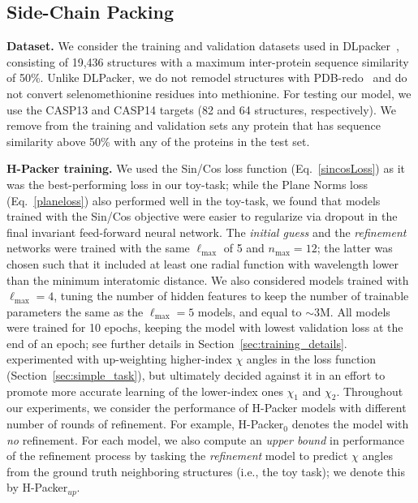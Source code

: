 \subsection{Side-Chain Packing}

\textbf{Dataset.} We consider the training and validation datasets used in 
DLpacker~\citep{misiura_dlpacker_2022}, consisting of 19,436 structures with a maximum
inter-protein sequence similarity of 50\%. Unlike DLPacker, we do not remodel structures with
PDB-redo~\citep{joosten_pdb_redo_2009} and do not convert selenomethionine residues into
methionine. For testing our model, we use the CASP13 and CASP14 targets (82 and 64 structures,
respectively). We remove from the training and validation sets any protein that has sequence
similarity above 50\% with any of the proteins in the test set.

\textbf{H-Packer training.} We used the Sin/Cos loss function (Eq.~\ref{sincosLoss}) as it was the
best-performing loss in our toy-task; while the Plane Norms loss (Eq.~\ref{planeloss}) also
performed well in the toy-task, we found that models trained with the Sin/Cos objective were easier
to regularize via dropout in the final invariant feed-forward neural network. The {\em initial
guess} and the {\em refinement} networks were trained with the same $\ell_{\text{max}}$ of 5 and
$n_{\text{max}}=12$; the latter was chosen such that it included at least one radial function with
wavelength lower than the minimum interatomic distance. We also considered models trained with
$\ell_{\text{max}} = 4$, tuning the number of hidden features to keep the number of trainable
parameters the same as the $\ell_{\text{max}} = 5$ models, and equal to $\sim$3M. All models were
trained for 10 epochs, keeping the model with lowest validation loss at the end of an epoch; see
further details in Section~\ref{sec:training_details}. %
experimented with up-weighting higher-index $\chi$ angles in the loss function
(Section~\ref{sec:simple_task}), but ultimately decided against it in an effort to promote more
accurate learning of the lower-index ones $\chi_1$ and $\chi_2$.
Throughout our experiments, we consider the performance of H-Packer models with different number of
rounds of refinement. For example, H-Packer$_0$ denotes the model with {\em no} refinement. For
each model, we also compute an {\em upper bound} in performance of the refinement process by
tasking the \textit{refinement} model to predict $\chi$ angles from the ground truth neighboring
structures (i.e., the toy task); we denote this by H-Packer$_{up}$.

